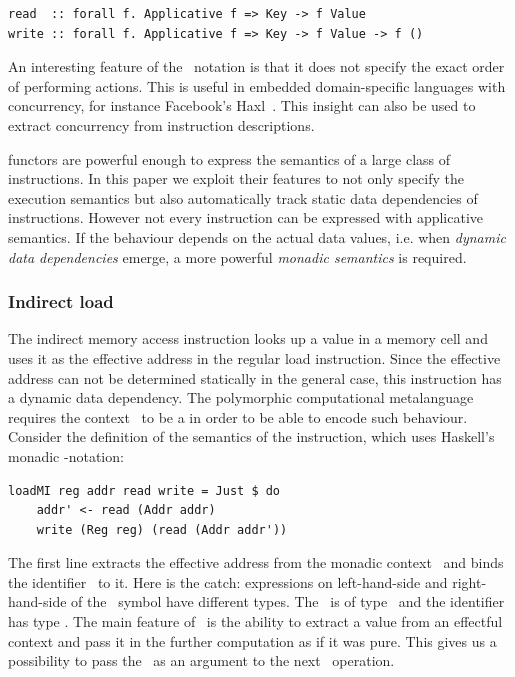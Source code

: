 \begin{verbatim}
read  :: forall f. Applicative f => Key -> f Value
write :: forall f. Applicative f => Key -> f Value -> f ()
\end{verbatim}

An interesting feature of the~ notation is that it does not
specify the exact order of performing actions. This is useful in
embedded domain-specific languages with concurrency, for instance
Facebook's Haxl~\cite{Marlow:2014:NFA:2692915.2628144}. This insight can also
be used to extract concurrency from instruction descriptions.

 functors are powerful enough to express the semantics of a
large class of instructions. In this paper we exploit their features to not only
specify the execution semantics but also automatically track static data dependencies
of instructions. However not every instruction can be expressed with applicative
semantics. If the behaviour depends on the actual data values,
i.e. when \emph{dynamic data dependencies} emerge, a more powerful
\emph{monadic semantics} is required.

\subsubsection{Indirect load}

The indirect memory access instruction looks up a value in a memory cell and uses
it as the effective address in the regular load instruction. Since the effective
address can not be determined statically in the general case, this instruction
has a dynamic data dependency. The polymorphic computational metalanguage requires
the context~ to be a  in order to be able to encode such behaviour.
Consider the definition of the semantics of the  instruction, which
uses Haskell's monadic -notation:

\begin{verbatim}
loadMI reg addr read write = Just $ do
    addr' <- read (Addr addr)
    write (Reg reg) (read (Addr addr'))
\end{verbatim}

\noindent
The first line extracts the effective address from the monadic context~
and binds the identifier~ to it. Here is the catch: expressions
on left-hand-side and right-hand-side of the~\hs{<-} symbol have different types.
The~ is of type~ and the
identifier~ has type . The main feature of~ is the
ability to extract a value from an effectful context and pass it in the further
computation as if it was pure. This gives us a possibility to pass the~
as an argument to the next~ operation.

